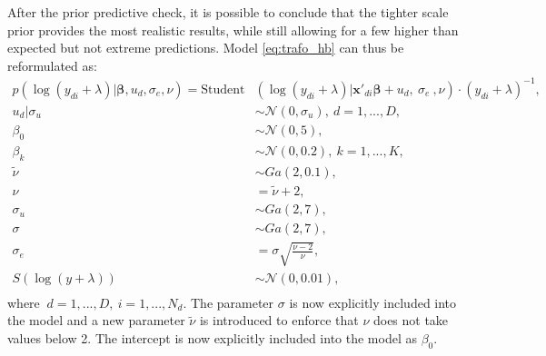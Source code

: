 After the prior predictive check, it is possible to conclude that the tighter scale prior provides the most realistic results, while still allowing for a few higher than expected but not extreme predictions.
Model \ref{eq:trafo_hb} can thus be reformulated as:
\begin{equation}
    \begin{split}
        p(\log(y_{di} + \lambda) |\boldsymbol \beta, u_d, \sigma_e, \nu)   =        \text{Student}&(\log(y_{di} + \lambda)| \boldsymbol{x'}_{di} \boldsymbol \beta + u_d,\ \sigma_e\ , \nu)\cdot (y_{di} + \lambda)^{-1}, \\
        u_d | \sigma_u & \sim \mathcal N(0, \sigma_u),\ d = 1, ..., D, \\
        \beta_0 & \sim \mathcal N (0, 5),\\
        \beta_k & \sim \mathcal N(0, 0.2),\ k = 1, ..., K,\\
        \tilde \nu & \sim Ga(2, 0.1), \\
        \nu & = \tilde \nu + 2,\\
        \sigma_u & \sim Ga(2, 7), \\
        \sigma & \sim Ga(2, 7), \\
        \sigma_e & = \sigma \sqrt{\frac{\nu - 2}{\nu}},\\
        S(\log(y + \lambda)) & \sim \mathcal N(0, 0.01),\\
    \end{split}
    \label{eq:trafo_coef_var}
\end{equation}
where $\ d = 1, ..., D,\ i = 1, ..., N_d$. The parameter $\sigma$ is now explicitly included into the model and a new parameter $\tilde \nu$ is introduced to enforce that $\nu$ does not take values below 2. The intercept is now explicitly included into the model as $\beta_0$.






